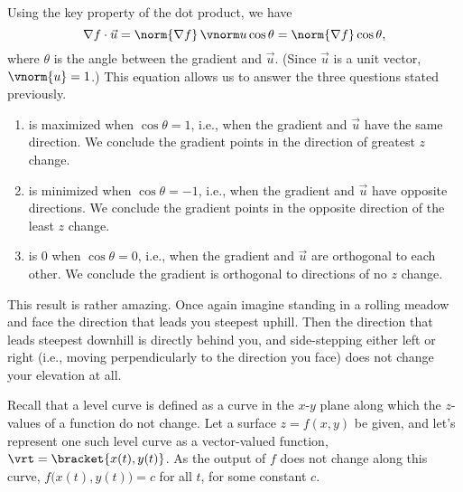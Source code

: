 Using the key property of the dot product, we have
\begin{equation}\nabla f\cdot \vec u = \norm{\nabla f}\,\vnorm u \cos \theta = \norm{\nabla f}\cos \theta, \label{eq:gradient}\end{equation}
where $\theta$ is the angle between the gradient and $\vec u$. (Since $\vec u$ is a unit vector, $\vnorm{u} = 1$.) This equation allows us to answer the three questions stated previously.

\begin{enumerate}
	\item {} is maximized when $\cos \theta =1$, i.e., when the gradient and $\vec u$ have the same direction. We conclude the gradient points in the direction of greatest $z$ change.
	\item	{} is minimized when $\cos \theta = -1$, i.e., when the gradient and $\vec u$ have opposite directions. We conclude the gradient points in the opposite direction of the least $z$ change.
	\item {} is 0 when $\cos \theta = 0$, i.e., when the gradient and $\vec u$ are orthogonal to each other. We conclude the gradient is orthogonal to directions of no $z$ change. 
\end{enumerate}

This result is rather amazing. Once again imagine standing in a rolling meadow and face the  direction that leads you steepest uphill. Then the direction that leads steepest downhill is directly behind you, and side-stepping either left or right (i.e., moving perpendicularly to the direction you face) does not change your elevation at all.


Recall that a level curve is defined as a curve in the $x$-$y$ plane along which the $z$-values of a function do not change. Let a surface $z=f(x,y)$ be given, and let's represent one such level curve as a vector-valued function, $\vrt =\bracket{x(t), y(t)}$. As the output of $f$ does not change along this curve, $f\big(x(t),y(t)\big) = c$ for all $t$, for some constant $c$.

